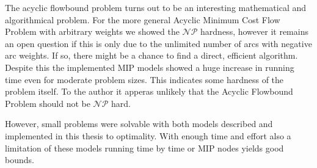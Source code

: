 

The acyclic flowbound problem turns out to be an interesting mathematical and algorithmical problem. For the more 
general Acyclic Minimum Cost Flow Problem with arbitrary weights we showed the $\mathcal{NP}$ hardness, however it 
remains an open question if this is only due to the unlimited number of arcs with negative arc weights. If so, there 
might be a chance to find a direct, efficient algorithm.
Despite this the implemented MIP models showed a huge increase in running time even for moderate problem sizes. This 
indicates some hardness of the problem itself. To the author it apperas unlikely that the Acyclic Flowbound Problem 
should not be $\mathcal{NP}$ hard.

However, small problems were solvable with both models described and implemented in this thesis to optimality. With 
enough time and effort also a limitation of these models running time by time or MIP nodes yields good bounds. 